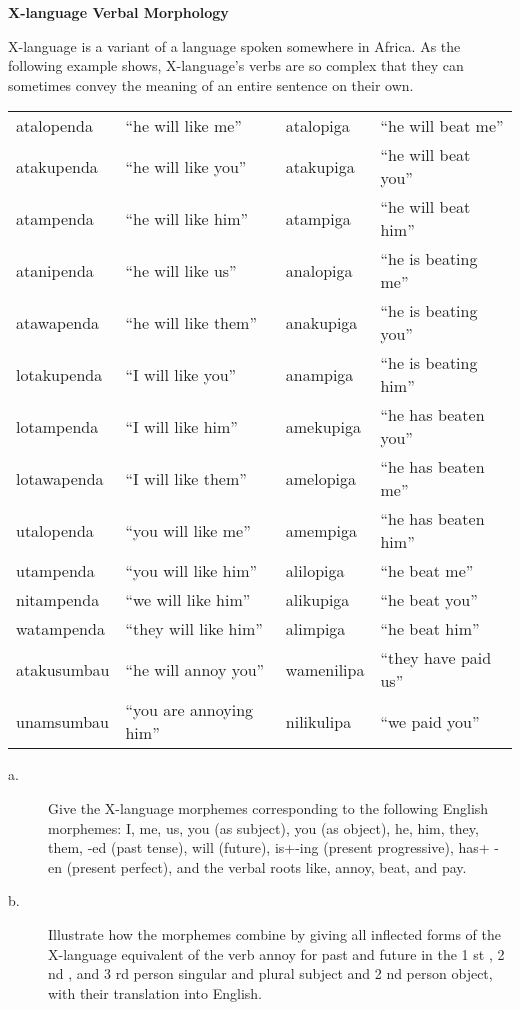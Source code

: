 \documentclass[11pt]{article}
\begin{document}
\begin{problem}{6}
\textbf{X-language Verbal Morphology}

X-language is a variant of a language spoken somewhere in Africa. As the following example shows, X-language's verbs are so complex that they can sometimes convey the meaning of an entire sentence on their own.

\begin{tabular}{l l | l l} 
\hline atalopenda & ``he will like me'' & atalopiga & ``he will beat me'' \\
atakupenda & ``he will like you'' & atakupiga & ``he will beat you'' \\
atampenda & ``he will like him'' & atampiga & ``he will beat him'' \\
atanipenda & ``he will like us'' & analopiga & ``he is beating me'' \\
atawapenda & ``he will like them'' & anakupiga & ``he is beating you'' \\
lotakupenda & ``I will like you'' & anampiga & ``he is beating him'' \\
lotampenda & ``I will like him'' & amekupiga & ``he has beaten you'' \\
lotawapenda & ``I will like them'' & amelopiga & ``he has beaten me'' \\
utalopenda & ``you will like me'' & amempiga & ``he has beaten him'' \\
utampenda & ``you will like him'' & alilopiga & ``he beat me'' \\
nitampenda & ``we will like him'' & alikupiga & ``he beat you'' \\
watampenda & ``they will like him'' & alimpiga & ``he beat him'' \\
atakusumbau & ``he will annoy you'' & wamenilipa & ``they have paid us'' \\
unamsumbau & ``you are annoying him'' & nilikulipa & ``we paid you'' \\ \hline
\end{tabular}

\begin{description}
	\item[a.] Give the X-language morphemes corresponding to the following English morphemes: I, me, us, you (as subject), you (as object), he, him, they, them, -ed (past tense), will (future), is+-ing (present progressive), has+ -en (present perfect), and the verbal roots like, annoy, beat, and pay.
	\item[b.] Illustrate how the morphemes combine by giving all inflected forms of the X-language equivalent of the verb annoy for past and future in the 1 st , 2 nd , and 3 rd person singular and plural subject and 2 nd person object, with their translation into English.
\end{description}

\end{problem}
\end{document}
